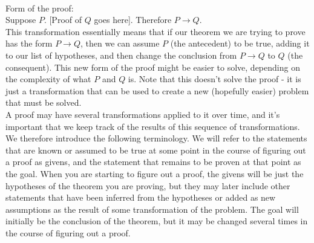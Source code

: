 \documentclass{article}
\begin{document}
 \\
Form of the proof:\\
Suppose $P$. [Proof of $Q$ goes here]. Therefore $P \rightarrow Q$.\\

\noindent This transformation essentially means that if our theorem we are trying to prove has the form $P \rightarrow Q$, then we can assume $P$ (the \gls{antecedent}) to be true, adding it to our list of hypotheses, and then change the conclusion from $P \rightarrow Q$ to $Q$ (the \gls{consequent}). This new form of the proof might be easier to solve, depending on the complexity of what $P$ and $Q$ is. Note that this doesn't solve the proof - it is just a transformation that can be used to create a new (hopefully easier) problem that must be solved.\\

\noindent A proof may have several transformations applied to it over time, and it's important that we keep track of the results of this sequence of transformations. We therefore introduce the following terminology. We will refer to the statements that are known or assumed to be true at some point in the course of figuring out a proof as \glspl{given}, and the statement that remains to be proven at that point as the \gls{goal}. When you are starting to figure out a proof, the givens will be just the hypotheses of the theorem you are proving, but they may later include other statements that have been inferred from the hypotheses or added as new assumptions as the result of some transformation of the problem. The goal will initially be the conclusion of the theorem, but it may be changed several times in the course of figuring out a proof.\\
\end{document}

